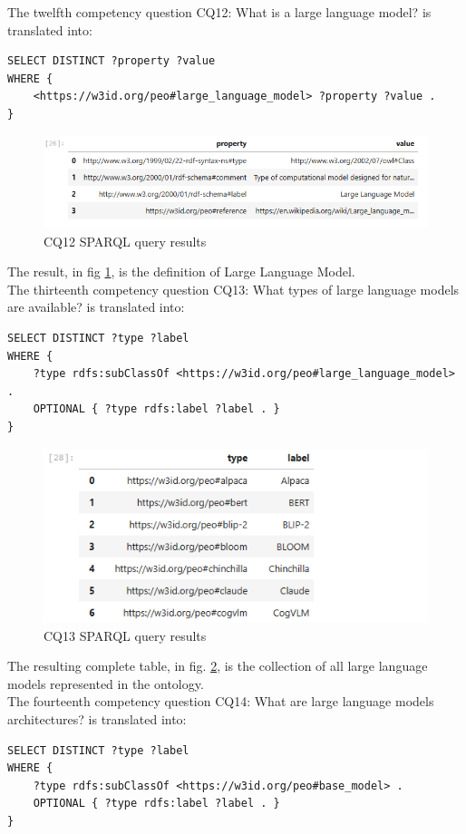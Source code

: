 The twelfth competency question CQ12: What is a large language model? is translated into:
\begin{lstlisting}
SELECT DISTINCT ?property ?value
WHERE {
    <https://w3id.org/peo#large_language_model> ?property ?value .
}
\end{lstlisting}

\begin{figure}[H]
    \centering
    \includegraphics[width=0.9\linewidth]{Figures/fig_58.png}
    \caption{CQ12 SPARQL query results}
    \label{fig:58}
\end{figure}
The result, in fig \ref{fig:58}, is the definition of Large Language Model.\\

The thirteenth competency question CQ13: What types of large language models are available? is translated into:
\begin{lstlisting}
SELECT DISTINCT ?type ?label
WHERE {
    ?type rdfs:subClassOf <https://w3id.org/peo#large_language_model> .
    OPTIONAL { ?type rdfs:label ?label . }
}
\end{lstlisting}

\begin{figure}[H]
    \centering
    \includegraphics[width=0.9\linewidth]{Figures/fig_59.png}
    \caption{CQ13 SPARQL query results}
    \label{fig:59}
\end{figure}
The resulting complete table, in fig. \ref{fig:59}, is the collection of all large language models represented in the ontology.\\

The fourteenth competency question CQ14: What are large language models architectures? is translated into:
\begin{lstlisting}
SELECT DISTINCT ?type ?label
WHERE {
    ?type rdfs:subClassOf <https://w3id.org/peo#base_model> .
    OPTIONAL { ?type rdfs:label ?label . }
}   
\end{lstlisting}

